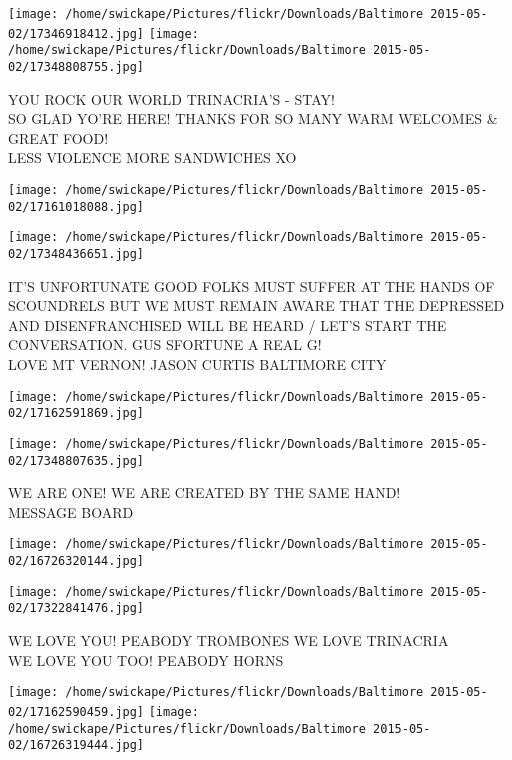 \documentclass[10pt,letterpaper]{article}
\begin{document}
\vspace{0.25in}
\texttt{[image: /home/swickape/Pictures/flickr/Downloads/Baltimore 2015-05-02/17346918412.jpg]}
\texttt{[image: /home/swickape/Pictures/flickr/Downloads/Baltimore 2015-05-02/17348808755.jpg]}

YOU ROCK OUR WORLD TRINACRIA'S {-} STAY!\\
SO GLAD YO'RE HERE!  THANKS FOR SO MANY WARM WELCOMES \& GREAT FOOD!\\
LESS VIOLENCE MORE SANDWICHES XO
\pagebreak

\texttt{[image: /home/swickape/Pictures/flickr/Downloads/Baltimore 2015-05-02/17161018088.jpg]}

\vspace{0.25in}
\texttt{[image: /home/swickape/Pictures/flickr/Downloads/Baltimore 2015-05-02/17348436651.jpg]}

IT'S UNFORTUNATE GOOD FOLKS MUST SUFFER AT THE HANDS OF SCOUNDRELS BUT WE MUST REMAIN AWARE THAT THE DEPRESSED AND DISENFRANCHISED WILL BE HEARD / LET'S START THE CONVERSATION.  GUS SFORTUNE A REAL G!\\
LOVE MT VERNON!  JASON CURTIS BALTIMORE CITY
\pagebreak

\texttt{[image: /home/swickape/Pictures/flickr/Downloads/Baltimore 2015-05-02/17162591869.jpg]}

\vspace{0.25in}
\texttt{[image: /home/swickape/Pictures/flickr/Downloads/Baltimore 2015-05-02/17348807635.jpg]}

WE ARE ONE!  WE ARE CREATED BY THE SAME HAND!\\
MESSAGE BOARD
\pagebreak

\texttt{[image: /home/swickape/Pictures/flickr/Downloads/Baltimore 2015-05-02/16726320144.jpg]}

\vspace{0.25in}
\texttt{[image: /home/swickape/Pictures/flickr/Downloads/Baltimore 2015-05-02/17322841476.jpg]}

WE LOVE YOU!  PEABODY TROMBONES WE LOVE TRINACRIA\\
WE LOVE YOU TOO!  PEABODY HORNS
\pagebreak

\texttt{[image: /home/swickape/Pictures/flickr/Downloads/Baltimore 2015-05-02/17162590459.jpg]}
\texttt{[image: /home/swickape/Pictures/flickr/Downloads/Baltimore 2015-05-02/16726319444.jpg]}
\end{document}
